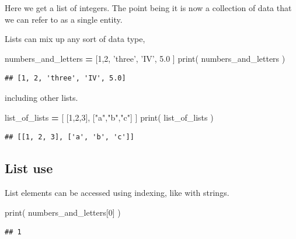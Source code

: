 \documentclass[]{book}
\newenvironment{Shaded}{\begin{snugshade}}{\end{snugshade}}
\newcommand{\BuiltInTok}[1]{#1}
\newcommand{\DecValTok}[1]{\textcolor[rgb]{0.00,0.00,0.81}{#1}}
\newcommand{\FloatTok}[1]{\textcolor[rgb]{0.00,0.00,0.81}{#1}}
\newcommand{\NormalTok}[1]{#1}
\newcommand{\OperatorTok}[1]{\textcolor[rgb]{0.81,0.36,0.00}{\textbf{#1}}}
\newcommand{\StringTok}[1]{\textcolor[rgb]{0.31,0.60,0.02}{#1}}
\theoremstyle{definition}
\theoremstyle{definition}
\theoremstyle{definition}
\theoremstyle{remark}
\begin{document}
Here we get a list of integers. The point being it is now a collection
of data that we can refer to as a single entity.

Lists can mix up any sort of data type,

\begin{Shaded}
\begin{Highlighting}[]
\NormalTok{numbers_and_letters }\OperatorTok{=}\NormalTok{ [}\DecValTok{1}\NormalTok{,}\DecValTok{2}\NormalTok{, }\StringTok{'three'}\NormalTok{, }\StringTok{'IV'}\NormalTok{, }\FloatTok{5.0}\NormalTok{ ]}
\BuiltInTok{print}\NormalTok{( numbers_and_letters )}
\end{Highlighting}
\end{Shaded}

\begin{verbatim}
## [1, 2, 'three', 'IV', 5.0]
\end{verbatim}

including other lists.

\begin{Shaded}
\begin{Highlighting}[]
\NormalTok{list_of_lists }\OperatorTok{=}\NormalTok{ [ [}\DecValTok{1}\NormalTok{,}\DecValTok{2}\NormalTok{,}\DecValTok{3}\NormalTok{], [}\StringTok{"a"}\NormalTok{,}\StringTok{"b"}\NormalTok{,}\StringTok{"c"}\NormalTok{] ]}
\BuiltInTok{print}\NormalTok{( list_of_lists )}
\end{Highlighting}
\end{Shaded}

\begin{verbatim}
## [[1, 2, 3], ['a', 'b', 'c']]
\end{verbatim}

\hypertarget{list-use}{%
\subsection{List use}\label{list-use}}

List elements can be accessed using indexing, like with strings.

\begin{Shaded}
\begin{Highlighting}[]
\BuiltInTok{print}\NormalTok{( numbers_and_letters[}\DecValTok{0}\NormalTok{] )}
\end{Highlighting}
\end{Shaded}

\begin{verbatim}
## 1
\end{verbatim}
\end{document}
